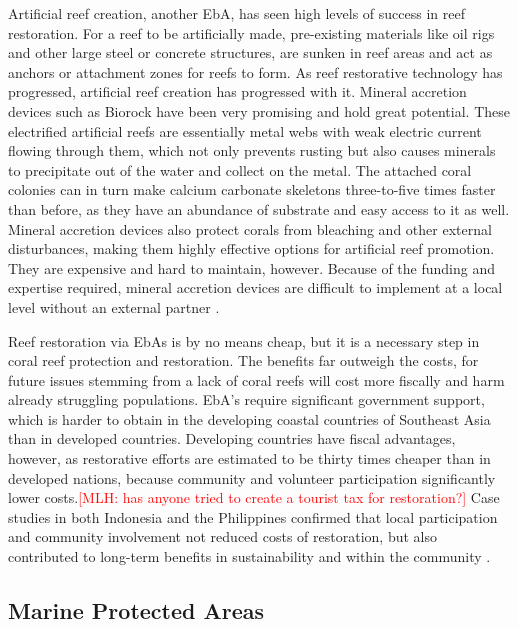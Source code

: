 \documentclass{book}\usepackage{knitr}
\newcommand{\red}[1]{\textcolor{red}{[MLH: #1]}}
\begin{document}
{Artificial reef creation, another EbA, has seen high levels of success in reef restoration. For a reef to be artificially made, pre-existing materials like oil rigs and other large steel or concrete structures, are sunken in reef areas and act as anchors or attachment zones for reefs to form. As reef restorative technology has progressed, artificial reef creation has progressed with it. Mineral accretion devices such as Biorock have been very promising and hold great potential. These electrified artificial reefs are essentially metal webs with weak electric current flowing through them, which not only prevents rusting but also causes minerals to precipitate out of the water and collect on the metal. The attached coral colonies can in turn make calcium carbonate skeletons three-to-five times faster than before, as they have an abundance of substrate and easy access to it as well. Mineral accretion devices also protect corals from bleaching and other external disturbances, making them highly effective options for artificial reef promotion. They are expensive and hard to maintain, however. Because of the funding and expertise required, mineral accretion devices are difficult to implement at a local level without an external partner \citep{areef}.

Reef restoration via EbAs is by no means cheap, but it is a necessary step in coral reef protection and restoration. The benefits far outweigh the costs, for future issues stemming from a lack of coral reefs will cost more fiscally and harm already struggling populations. EbA’s require significant government support, which is harder to obtain in the developing coastal countries of Southeast Asia than in developed countries. Developing countries have fiscal advantages, however, as restorative efforts are estimated to be thirty times cheaper than in developed nations, because community and volunteer participation significantly lower costs.\red{has anyone tried to create a tourist tax for restoration?} Case studies in both Indonesia and the Philippines confirmed that local participation and community involvement not reduced costs of restoration, but also contributed to long-term benefits in sustainability and within the community \citep{14551496520201201}.

\subsection{Marine Protected Areas}

}
\end{document}
